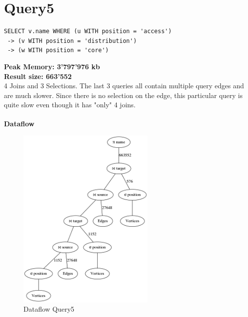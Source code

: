 \documentclass[11pt,singlecolumn]{scrartcl}
\begin{document}
\section{Query5}
\begin{verbatim}
SELECT v.name WHERE (u WITH position = 'access')
 -> (v WITH position = 'distribution')
 -> (w WITH position = 'core')\end{verbatim}
\textbf{Peak Memory: 3'797'976 kb}\\
\textbf{Result size: 663'552}\\
4 Joins and 3 Selections. The last 3 queries all contain multiple query edges and are much slower. Since there is no selection on the edge, this particular query is quite slow even though it has "only" 4 joins.\\\\
\textbf{Dataflow}
\begin{figure}[H]
\includegraphics[width=0.6\textwidth]{graph5}
\caption{Dataflow Query5}
\end{figure}
\clearpage
\end{document}
